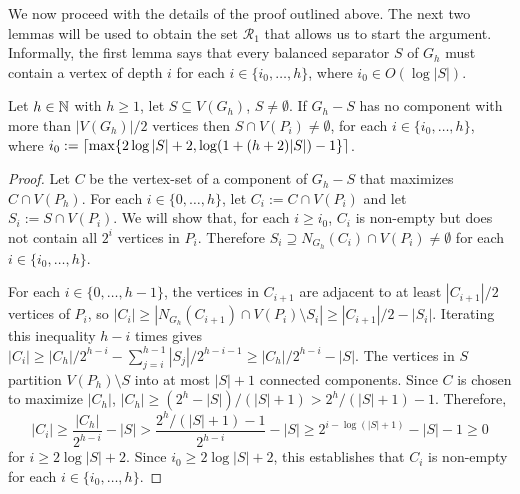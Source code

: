 \documentclass{patmorin}
\renewcommand{\ge}{\geqslant}
\renewcommand{\geq}{\geqslant}
\begin{document}
We now proceed with the details of the proof outlined above.  The next two lemmas will be used to obtain the set $\mathcal{R}_1$ that allows us to start the argument.  Informally, the first lemma says that every balanced separator $S$ of $G_h$ must contain a vertex of depth $i$ for each $i\in\{i_0,\ldots,h\}$, where $i_0\in O(\log|S|)$.

\begin{lem}\label{small_depth_separator}
  Let $h\in\mathbb{N}$ with $h\geq 1$, let $S\subseteq V(G_h)$, $S\neq\emptyset$.  If $G_h-S$ has no component with more than $|V(G_h)|/2$ vertices then $S\cap V(P_i)\neq\emptyset$, for each $i\in\{i_0,\ldots,h\}$, where $i_0:={\lceil \max\{2\log|S|+2, \log(1+(h+2)|S|)-1\} \rceil}$.
\end{lem}

\begin{proof}
  Let $C$ be the vertex-set of a component of $G_h-S$ that maximizes $C\cap V(P_h)$. For each $i\in\{0,\ldots,h\}$, let $C_i:=C\cap V(P_i)$ and let $S_i:=S\cap V(P_i)$. We will show that, for each $i\ge i_0$, $C_i$ is non-empty but does not contain all $2^i$ vertices in $P_i$.  Therefore $S_i\supseteq N_{G_h}(C_i)\cap V(P_i)\neq\emptyset$ for each $i\in\{i_0,\ldots,h\}$.

  For each $i\in\{0,\ldots,h-1\}$, the vertices in $C_{i+1}$ are adjacent to at least $|C_{i+1}|/2$ vertices of $P_{i}$, so $|C_i|\ge |N_{G_h}(C_{i+1})\cap V(P_i)\setminus S_i| \ge |C_{i+1}|/2 - |S_i|$.  Iterating this inequality $h-i$ times gives $|C_i|\ge |C_h|/2^{h-i}-\sum_{j=i}^{h-1}|S_j|/2^{h-i-1}\ge |C_h|/2^{h-i}-|S|$.  The vertices in $S$ partition $V(P_h)\setminus S$ into at most $|S|+1$ connected components.  Since $C$ is chosen to maximize $|C_h|$, $|C_h| \ge (2^h-|S|)/(|S|+1) > 2^{h}/(|S|+1) - 1$.  Therefore,
  \begin{equation}
    |C_i|\ge \frac{|C_h|}{2^{h-i}} - |S| > \frac{2^h/(|S|+1)-1}{2^{h-i}} - |S|
    \ge 2^{i-\log(|S|+1)}-|S|-1 \ge 0
  \end{equation}
  for $i\ge 2\log |S|+2$.  Since $i_0\ge 2\log |S|+2$, this establishes that $C_i$ is non-empty for each $i\in\{i_0,\ldots,h\}$.


\end{proof}
\end{document}
